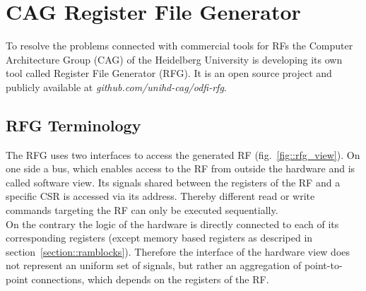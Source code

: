 \section{CAG Register File Generator}
To resolve the problems connected with commercial tools for RFs the Computer Architecture Group (CAG) of the Heidelberg University is developing its own tool called Register File Generator (RFG). It is an open source project and publicly available at \emph{github.com/unihd-cag/odfi-rfg}.

\subsection{RFG Terminology}\label{section::rfg_term}

The RFG uses two interfaces to access the generated RF (fig.~\ref{fig::rfg_view}). On one side a bus, which enables access to the RF from outside the hardware and is called software view. Its signals shared between the registers of the RF and a specific CSR is accessed via its address. Thereby different read or write commands targeting the RF can only be executed sequentially.\\
On the contrary the logic of the hardware is directly connected to each of its corresponding registers (except memory based registers as descriped in section~\ref{section::ramblocks}). Therefore the interface of the hardware view does not represent an uniform set of signals, but rather an aggregation of point-to-point connections, which depends on the registers of the RF.

